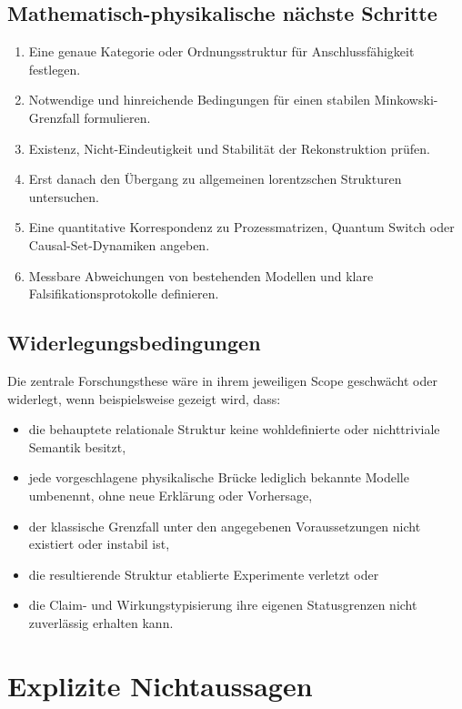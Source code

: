 \documentclass[11pt,a4paper]{article}
\begin{document}
\subsection{Mathematisch-physikalische nächste Schritte}

\begin{enumerate}
  \item Eine genaue Kategorie oder Ordnungsstruktur für Anschlussfähigkeit
  festlegen.
  \item Notwendige und hinreichende Bedingungen für einen stabilen
  Minkowski-Grenzfall formulieren.
  \item Existenz, Nicht-Eindeutigkeit und Stabilität der Rekonstruktion prüfen.
  \item Erst danach den Übergang zu allgemeinen lorentzschen Strukturen
  untersuchen.
  \item Eine quantitative Korrespondenz zu Prozessmatrizen, Quantum Switch oder
  Causal-Set-Dynamiken angeben.
  \item Messbare Abweichungen von bestehenden Modellen und klare
  Falsifikationsprotokolle definieren.
\end{enumerate}

\subsection{Widerlegungsbedingungen}

Die zentrale Forschungsthese wäre in ihrem jeweiligen Scope geschwächt oder
widerlegt, wenn beispielsweise gezeigt wird, dass:

\begin{itemize}
  \item die behauptete relationale Struktur keine wohldefinierte oder
  nichttriviale Semantik besitzt,
  \item jede vorgeschlagene physikalische Brücke lediglich bekannte Modelle
  umbenennt, ohne neue Erklärung oder Vorhersage,
  \item der klassische Grenzfall unter den angegebenen Voraussetzungen nicht
  existiert oder instabil ist,
  \item die resultierende Struktur etablierte Experimente verletzt oder
  \item die Claim- und Wirkungstypisierung ihre eigenen Statusgrenzen nicht
  zuverlässig erhalten kann.
\end{itemize}

\section{Explizite Nichtaussagen}
\end{document}

